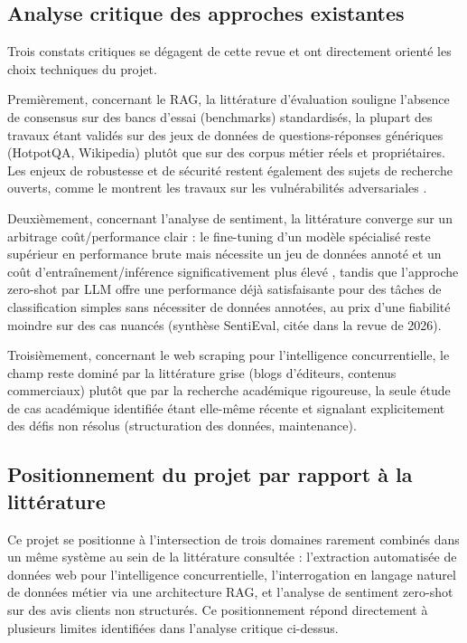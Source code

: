 \subsection{Analyse critique des approches existantes}

Trois constats critiques se dégagent de cette revue et ont directement orienté les choix techniques du
projet.

Premièrement, concernant le RAG, la littérature d'évaluation \cite{yu2024} souligne l'absence de consensus
sur des bancs d'essai (benchmarks) standardisés, la plupart des travaux étant validés sur des jeux de
données de questions-réponses génériques (HotpotQA, Wikipedia) plutôt que sur des corpus métier réels et
propriétaires. Les enjeux de robustesse et de sécurité restent également des sujets de recherche ouverts,
comme le montrent les travaux sur les vulnérabilités adversariales \cite{xue2024}.

Deuxièmement, concernant l'analyse de sentiment, la littérature converge sur un arbitrage coût/performance
clair : le fine-tuning d'un modèle spécialisé reste supérieur en performance brute mais nécessite un jeu de
données annoté et un coût d'entraînement/inférence significativement plus élevé \cite{simmering2023}, tandis
que l'approche zero-shot par LLM offre une performance déjà satisfaisante pour des tâches de classification
simples sans nécessiter de données annotées, au prix d'une fiabilité moindre sur des cas nuancés (synthèse
SentiEval, citée dans la revue de 2026).

Troisièmement, concernant le web scraping pour l'intelligence concurrentielle, le champ reste dominé par la
littérature grise (blogs d'éditeurs, contenus commerciaux) plutôt que par la recherche académique rigoureuse,
la seule étude de cas académique identifiée \cite{springer2025} étant elle-même récente et signalant
explicitement des défis non résolus (structuration des données, maintenance).

\subsection{Positionnement du projet par rapport à la littérature}

Ce projet se positionne à l'intersection de trois domaines rarement combinés dans un même système au sein de
la littérature consultée : l'extraction automatisée de données web pour l'intelligence concurrentielle,
l'interrogation en langage naturel de données métier via une architecture RAG, et l'analyse de sentiment
zero-shot sur des avis clients non structurés. Ce positionnement répond directement à plusieurs limites
identifiées dans l'analyse critique ci-dessus.

